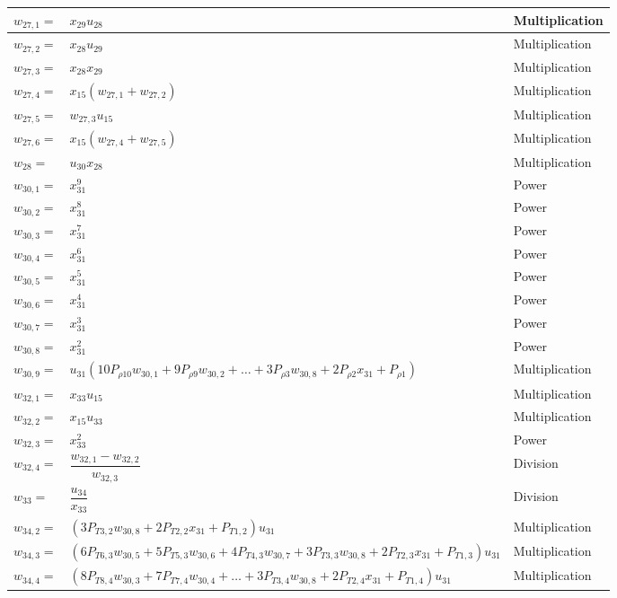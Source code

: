 \begin{longtable}{|p{1.5cm}|l|p{2cm}|}
$w_{27,1}=$ & $ x_{29}u_{28} $ & Multiplication \\ \hline
$w_{27,2}=$ & $ x_{28}u_{29} $ & Multiplication \\ \hline
$w_{27,3}=$ & $ x_{28}x_{29} $ & Multiplication \\ \hline
$w_{27,4}=$ & $ x_{15}\left(w_{27,1}+w_{27,2}\right) $ & Multiplication \\ \hline
$w_{27,5}=$ & $ w_{27,3}u_{15} $ & Multiplication \\ \hline
$w_{27,6}=$ & $ x_{15}\left(w_{27,4}+w_{27,5}\right) $ & Multiplication \\ \hline 
$w_{28}=$ & $ u_{30}x_{28} $ & Multiplication \\ \hline
$w_{30,1}=$ & $ x_{31}^{9} $ & Power \\ \hline
$w_{30,2}=$ & $ x_{31}^{8} $ & Power \\ \hline
$w_{30,3}=$ & $ x_{31}^{7} $ & Power \\ \hline
$w_{30,4}=$ & $ x_{31}^{6} $ & Power \\ \hline
$w_{30,5}=$ & $ x_{31}^{5} $ & Power \\ \hline
$w_{30,6}=$ & $ x_{31}^{4} $ & Power \\ \hline
$w_{30,7}=$ & $ x_{31}^{3} $ & Power \\ \hline
$w_{30,8}=$ & $ x_{31}^{2} $ & Power \\ \hline
$w_{30,9}=$ & $ u_{31}\left(10 P_{\rho 10}w_{30,1}+9 P_{\rho 9}w_{30,2}+\dots+3 P_{\rho 3}w_{30,8}+2 P_{\rho 2}x_{31}+P_{\rho 1}\right) $ & Multiplication \\ \hline
$w_{32,1}=$ & $ x_{33}u_{15} $ & Multiplication \\ \hline
$w_{32,2}=$ & $ x_{15}u_{33} $ & Multiplication \\ \hline
$w_{32,3}=$ & $ x_{33}^{2} $ & Power \\ \hline
$w_{32,4}=$ & $ \dfrac{w_{32,1}-w_{32,2}}{w_{32,3}} $ & Division \\ \hline
$w_{33}=$ & $ \dfrac{u_{34}}{x_{33}} $ & Division \\ \hline
$w_{34,2}=$ & $ \left(3P_{T 3,2}w_{30,8}+2P_{T 2,2}x_{31}+P_{T 1,2}\right)u_{31} $ & Multiplication \\ \hline
$w_{34,3}=$ & $ \left(6 P_{T 6,3}w_{30,5}+5P_{T 5,3}w_{30,6}+4P_{T 4,3}w_{30,7}+3P_{T 3,3}w_{30,8}+2P_{T 2,3}x_{31}+P_{T 1,3}\right)u_{31} $ & Multiplication \\ \hline
$w_{34,4}=$ & $ \left(8 P_{T 8,4}w_{30,3}+7P_{T 7,4}w_{30,4}+\dots+3P_{T 3,4}w_{30,8}+2P_{T 2,4}x_{31}+P_{T 1,4}\right)u_{31} $ & Multiplication \\ \hline

\end{longtable}
